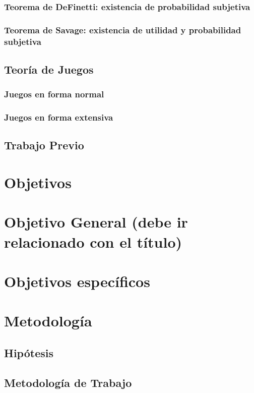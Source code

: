 \documentclass[11pt]{article}
\theoremstyle{plain}
\begin{document}
		\subsubsection{Teorema de DeFinetti: existencia de probabilidad subjetiva}
		\subsubsection{Teorema de Savage: existencia de utilidad y probabilidad subjetiva}
	\subsection{Teoría de Juegos}
		\subsubsection{Juegos en forma normal}
		\subsubsection{Juegos en forma extensiva}
	
	\subsection{Trabajo Previo}

\section{Objetivos}
	\section{Objetivo General (debe ir relacionado con el título)}
	\section{Objetivos específicos}
	
\section{Metodología}
	\subsection{Hipótesis}
	\subsection{Metodología de Trabajo}
\end{document}
